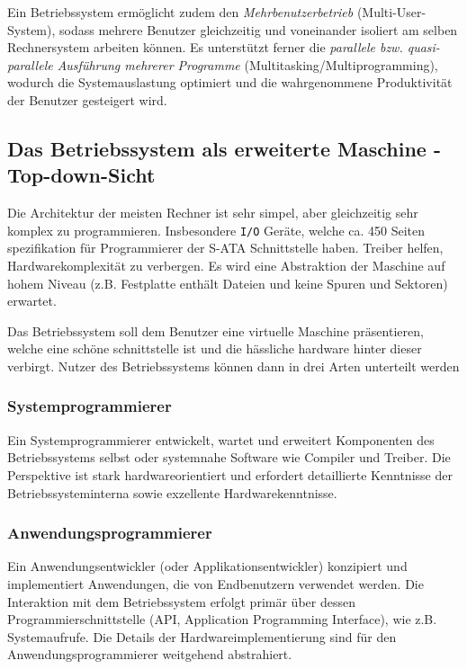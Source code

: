 Ein Betriebssystem ermöglicht zudem den \textit{Mehrbenutzerbetrieb} (Multi-User-System), sodass mehrere Benutzer gleichzeitig und voneinander isoliert am selben Rechnersystem arbeiten können. Es unterstützt ferner die \textit{parallele bzw. quasi-parallele Ausführung mehrerer Programme} (Multitasking/Multiprogramming), wodurch die Systemauslastung optimiert und die wahrgenommene Produktivität der Benutzer gesteigert wird.

\subsection{Das Betriebssystem als erweiterte Maschine - Top-down-Sicht}

Die Architektur der meisten Rechner ist sehr simpel, aber gleichzeitig sehr komplex zu programmieren. Insbesondere \texttt{I/O} Geräte, welche ca. 450 Seiten spezifikation für Programmierer der S-ATA Schnittstelle haben. Treiber helfen, Hardwarekomplexität zu verbergen. Es wird eine Abstraktion der Maschine auf hohem Niveau (z.B. Festplatte enthält Dateien und keine Spuren und Sektoren) erwartet.

Das Betriebssystem soll dem Benutzer eine virtuelle Maschine präsentieren, welche eine schöne schnittstelle ist und die hässliche hardware hinter dieser verbirgt. Nutzer des Betriebssystems können dann in drei Arten unterteilt werden

\subsubsection*{Systemprogrammierer}
Ein Systemprogrammierer entwickelt, wartet und erweitert Komponenten des Betriebssystems selbst oder systemnahe Software wie Compiler und Treiber. Die Perspektive ist stark hardwareorientiert und erfordert detaillierte Kenntnisse der Betriebssysteminterna sowie exzellente Hardwarekenntnisse.

\subsubsection*{Anwendungsprogrammierer}
Ein Anwendungsentwickler (oder Applikationsentwickler) konzipiert und implementiert Anwendungen, die von Endbenutzern verwendet werden. Die Interaktion mit dem Betriebssystem erfolgt primär über dessen Programmierschnittstelle (API, Application Programming Interface), wie z.B. Systemaufrufe. Die Details der Hardwareimplementierung sind für den Anwendungsprogrammierer weitgehend abstrahiert.

